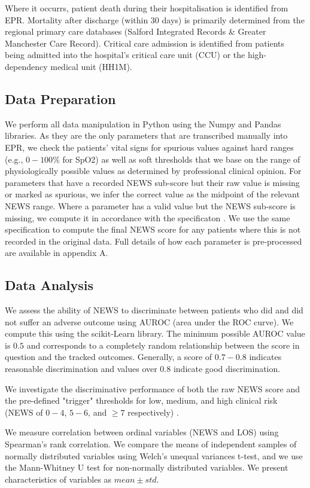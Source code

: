 \documentclass[10pt,journal, compsoc]{IEEEtran}
\begin{document}
Where it occurrs, patient death during their hospitalisation is identified from EPR. Mortality after discharge (within 30 days) is primarily determined from the regional primary care databases (Salford Integrated Records \& Greater Manchester Care Record). Critical care admission is identified from patients being admitted into the hospital's critical care unit (CCU) or the high-dependency medical unit (HH1M).

\subsection{Data Preparation} We perform all data manipulation in Python using the Numpy and Pandas libraries. As they are the only parameters that are transcribed manually into EPR, we check the patients' vital signs for spurious values against hard ranges (e.g., $0-100\%$ for SpO2) as well as soft thresholds that we base on the range of physiologically possible values as determined by professional clinical opinion. For parameters that have a recorded NEWS sub-score but their raw value is missing or marked as spurious, we infer the correct value as the midpoint of the relevant NEWS range. Where a parameter has a valid value but the NEWS sub-score is missing, we compute it in accordance with the specificaton \cite[pp.~28-30]{RCP17}. We use the same specification to compute the final NEWS score for any patients where this is not recorded in the original data. Full details of how each parameter is pre-processed are available in appendix A.

\subsection{Data Analysis} We assess the ability of NEWS to discriminate between patients who did and did not suffer an adverse outcome using AUROC (area under the ROC curve). We compute this using the scikit-Learn library. The minimum possible AUROC value is $0.5$ and corresponds to a completely random relationship between the score in question and the tracked outcomes. Generally, a score of $0.7-0.8$ indicates reasonable discrimination and values over $0.8$ indicate good discrimination.

We investigate the discriminative performance of both the raw NEWS score and the pre-defined "trigger" thresholds for low, medium, and high clinical risk (NEWS of $0-4$, $5-6$, and $\geq 7$ respectively) \cite[pp.~30]{RCP17}.

We measure correlation between ordinal variables (NEWS and LOS) using Spearman's rank correlation. We compare the means of independent samples of normally distributed variables using Welch's unequal variances t-test, and we use the Mann-Whitney U test for non-normally distributed variables. We present characteristics of variables as $mean \pm std$.
\end{document}
